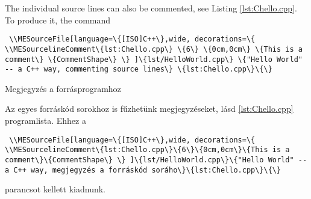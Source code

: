 {
The individual source lines can also be commented, see Listing \ref{lst:Chello.cpp}.
To produce it, the command
\par\noindent\lstinline|
\\MESourceFile[language=\{[ISO]C++\},wide,
decorations=\{
\\MESourcelineComment\{lst:Chello.cpp\} \{6\} \{0cm,0cm\} \{This is a comment\} \{CommentShape\}
\}
]\{lst/HelloWorld.cpp\} \{"Hello World" -- a C++ way, commenting source lines\} \{lst:Chello.cpp\}\{\}
|

}
{Megjegyzés a forrásprogramhoz}
{
Az egyes forráskód sorokhoz is fűzhetünk megjegyzéseket, lásd  \ref{lst:Chello.cpp} programlista.
Ehhez a
\par\noindent\lstinline|
\\MESourceFile[language=\{[ISO]C++\},wide,
decorations=\{
\\MESourcelineComment\{lst:Chello.cpp\}\{6\}\{0cm,0cm\}\{This is a comment\}\{CommentShape\}
\}
]\{lst/HelloWorld.cpp\}\{"Hello World" -- a C++ way, megjegyzés a forráskód soráho\}\{lst:Chello.cpp\}\{\}
|\par\noindent parancsot kellett kiadnunk.

}


